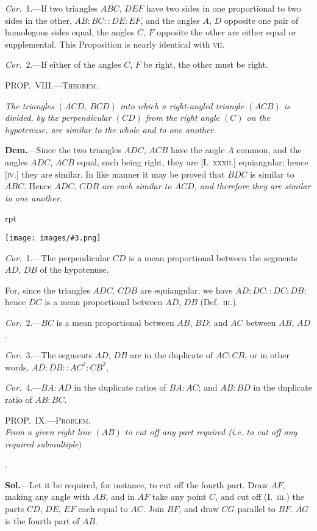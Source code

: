 \documentclass[oneside]{book}
\newcounter{wrapwidth}
\newcommand\myprop[2]{
\bigskip\Needspace*{4\baselineskip}\begin{center}\textsc{#1}\\\medskip\emph{#2}\par\end{center}
}
\newcommand\mypropl[2]{
\bigskip\Needspace*{4\baselineskip}\begin{center}\textsc{#1}\end{center}
\hspace{\parindent}\emph{#2}\par\medskip
}
\newcommand\imgflow[3]{
\setcounter{wrapwidth}{#1}
\begin{wrapfigure}[#2]{r}{\value{wrapwidth}pt}
\begin{center}
\vspace{-0.3in}
\texttt{[image: images/\#3.png]}
\end{center}
\end{wrapfigure}
}
\begin{document}
\emph{Cor.}~1.---If two triangles $ABC$, $DEF$ have two sides
in one proportional to two sides in the other, $AB:BC
::DE:EF$, and the angles $A$, $D$ opposite one pair of
homologous sides equal, the angles $C$, $F$ opposite the
other are either equal or supplemental. This Proposition
is nearly identical with \textsc{vii.}

\emph{Cor.}~2.---If either of the angles $C$, $F$ be right, the
other must be right.

\mypropl{PROP\@.~VIII\@.---Theorem.}{The triangles $(ACD,\ BCD)$ into which a right-angled
triangle $(ACB)$ is divided, by the perpendicular $(CD)$ from
the right angle $(C)$ on the hypotenuse, are similar to the
whole and to one another.}


\textbf{Dem.}---Since the two triangles $ADC$, $ACB$ have the
angle $A$ common, and the angles
$ADC$, $ACB$ equal, each being
right, they are [I.~\textsc{xxxii.}] equiangular;
hence [\textsc{iv}.] they are
similar. In like manner it may
be proved that $BDC$ is similar
to $ABC$. Hence $ADC$, $CDB$ \textit{are
each similar to $ACD$, and therefore they are similar to one
another.}

\imgflow{110}{6}{f176}

\emph{Cor.}~1.---The perpendicular $CD$ is a mean proportional
between the segments $AD$, $DB$ of the hypotenuse.

For, since the triangles $ADC$, $CDB$ are equiangular,
we have $AD:DC::DC:DB$; hence $DC$ is a mean
proportional between $AD$, $DB$ (Def.~\textsc{iii.}).

\emph{Cor.}~2.---$BC$ is a mean proportional between $AB$,
$BD$; and $AC$ between $AB$, $AD$.

\emph{Cor.}~3.---The segments $AD$, $DB$ are in the duplicate
of $AC:CB$, or in other words, $AD:DB::AC^2:CB^2$,

\emph{Cor.}~4.---$BA:AD$ in the duplicate ratios of $BA:AC$;
and $AB:BD$ in the duplicate ratio of $AB:BC$.

\myprop{PROP\@.~IX\@.---Problem.}{From a given right line $(AB)$ to cut off any part required
\textrm{(i.e.} to cut off any required submultiple$)$}.

\textbf{Sol.}---Let it be required, for instance, to cut off the
fourth part. Draw $AF$, making any angle with $AB$,
and in $AF$ take any point $C$, and cut off (I.~\textsc{iii.}) the
parts $CD$, $DE$, $EF$ each equal to $AC$. Join $BF$, and
draw $CG$ parallel to $BF$. $AG$ is the fourth part of
$AB$.
\end{document}
